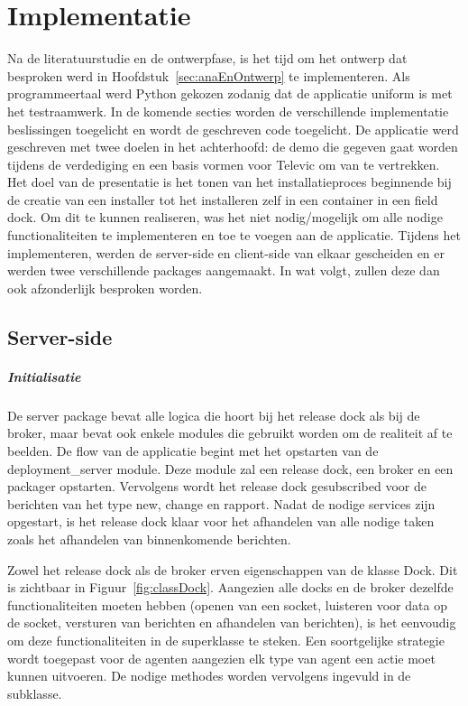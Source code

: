 \chapter{Implementatie}
Na de literatuurstudie en de ontwerpfase, is het tijd om het ontwerp dat besproken werd in Hoofdstuk~\vref{sec:anaEnOntwerp} te implementeren.
Als programmeertaal werd Python gekozen zodanig dat de applicatie uniform is met het testraamwerk.
In de komende secties worden de verschillende implementatie beslissingen toegelicht en wordt de geschreven code toegelicht.
De applicatie werd geschreven met twee doelen in het achterhoofd: de demo die gegeven gaat worden tijdens de verdediging en een basis vormen voor Televic om van te vertrekken.
Het doel van de presentatie is het tonen van het installatieproces beginnende bij de creatie van een installer tot het installeren zelf in een container in een field dock.
Om dit te kunnen realiseren, was het niet nodig/mogelijk om alle nodige functionaliteiten te implementeren en toe te voegen aan de applicatie.
Tijdens het implementeren, werden de server-side en client-side van elkaar gescheiden en er werden twee verschillende packages aangemaakt.
In wat volgt, zullen deze dan ook afzonderlijk besproken worden.

\section{Server-side}
\paragraph{Initialisatie} 
De server package bevat alle logica die hoort bij het release dock als bij de broker, maar bevat ook enkele modules die gebruikt worden om de realiteit af te beelden.
De flow van de applicatie begint met het opstarten van de deployment\_server module.
Deze module zal een release dock, een broker en een packager opstarten.
Vervolgens wordt het release dock gesubscribed voor de berichten van het type new, change en rapport.
Nadat de nodige services zijn opgestart, is het release dock klaar voor het afhandelen van alle nodige taken zoals het afhandelen van binnenkomende berichten.

Zowel het release dock als de broker erven eigenschappen van de klasse Dock.
Dit is zichtbaar in Figuur~\vref{fig:classDock}.
Aangezien alle docks en de broker dezelfde functionaliteiten moeten hebben (openen van een socket, luisteren voor data op de socket, versturen van berichten en afhandelen van berichten), is het eenvoudig om deze functionaliteiten in de superklasse te steken.
Een soortgelijke strategie wordt toegepast voor de agenten aangezien elk type van agent een actie moet kunnen uitvoeren.
De nodige methodes worden vervolgens ingevuld in de subklasse. 

